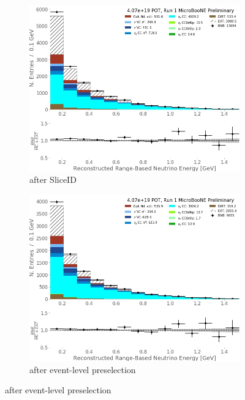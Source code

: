 \begin{figure}[H] 
\begin{center}
    \begin{subfigure}[b]{0.3\textwidth}
    \centering
    \includegraphics[width=1.00\textwidth]{NuMuCCsel/Images/Ryan/Run1_recoErange_SliceID.jpg}
    \caption{\label{fig:NuMUCCsel:ryan:trklenSliceID} after SliceID}
    \end{subfigure}
    \begin{subfigure}[b]{0.3\textwidth}
    \centering
    \includegraphics[width=1.00\textwidth]{NuMuCCsel/Images/Ryan/Run1_recoErange_EvtSel.jpg}
    \caption{\label{fig:NuMUCCsel:ryan:trklenEvt} after event-level preselection}

\end{subfigure}
\end{center}
\end{figure}
